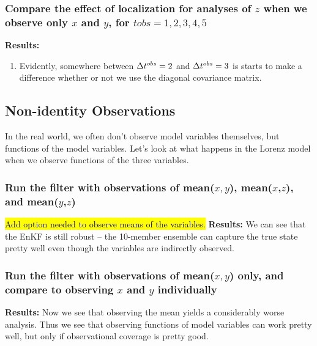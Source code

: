 \subsubsection{Compare the effect of localization for analyses of $z$ when we observe only $x$ and $y$, for $tobs = 1,2,3,4,5$}  

\textbf{Results:}
\begin{enumerate}
\item Evidently, somewhere between $\Delta t^{obs}=2$ and $\Delta t^{obs} = 3$ is starts to make a difference whether or not we use the diagonal covariance matrix.
\end{enumerate}


\subsection{Non-identity Observations}

In the real world, we often don't observe model variables themselves, but functions of the model variables.  
Let's look at what happens in the Lorenz model when we observe  functions of the three variables.  

\subsubsection{Run the filter with observations of mean($x,y$), mean($x$,$z$), and mean($y$,$z$)}
\hl{Add option needed to observe means of the variables.}
%
\textbf{Results:}
We can see that the EnKF is still robust -- the 10-member ensemble can capture the true state pretty well even though the variables are indirectly observed. 


\subsubsection{Run the filter with observations of mean($x,y$) only, and compare to observing $x$ and $y$ individually}
%
\textbf{Results:}
Now we see that observing the mean yields a considerably worse analysis.  Thus we see that observing functions of model variables can work pretty well, but only if observational coverage is pretty good.
